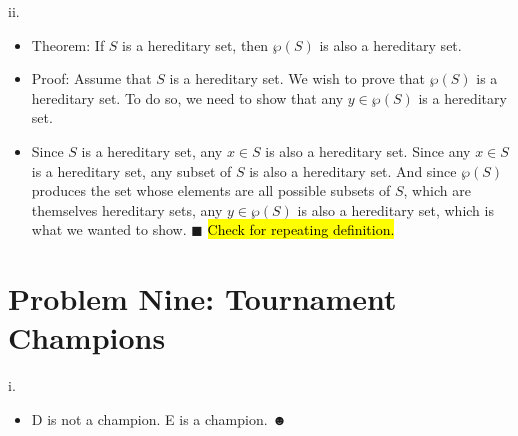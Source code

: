 \documentclass{article}
\renewcommand{\(}{\left(}
\renewcommand{\)}{\right)}
\newcommand{\powerset}[1]{\wp\left(#1\right)}
\theoremstyle{plain}
\theoremstyle{plain}
\theoremstyle{definition}
\begin{document}
    ii.
    \begin{shaded}
        \begin{itemize}
            \item 
                Theorem: If $S$ is a hereditary set, then $\powerset{S}$ is also a hereditary set.
            \item 
                Proof: Assume that $S$ is a hereditary set. We wish to prove that $\powerset{S}$ is a hereditary set. To do so, we need to show that any $y\in \powerset{S}$ is a hereditary set.
            \item
                Since $S$ is a hereditary set, any $x\in S$ is also a hereditary set. Since any $x\in S$ is a hereditary set, any subset of $S$ is also a hereditary set. And since $\powerset{S}$ produces the set whose elements are all possible subsets of $S$, which are themselves hereditary sets, any $y\in \powerset{S}$ is also a hereditary set, which is what we wanted to show. $\blacksquare$ \hl{Check for repeating definition.}
        \end{itemize}
    \end{shaded}
    
\newpage

\section*{Problem Nine: Tournament Champions}
    i.
    \begin{shaded}
        \begin{itemize}
            \item 
                D is not a champion. E is a champion. $\blacksmiley$
        \end{itemize}
    \end{shaded}
    
\end{document}
